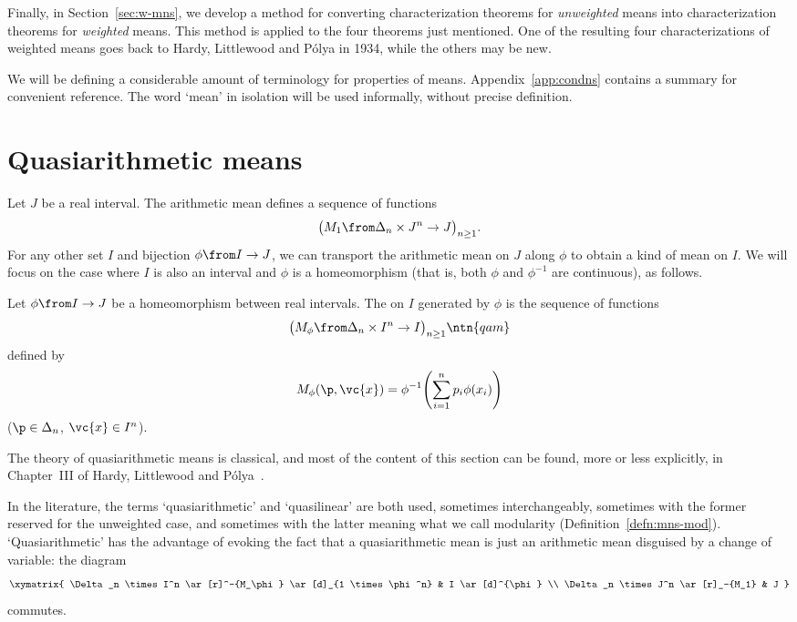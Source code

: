 Finally, in Section~\ref{sec:w-mns}, we develop a method for converting
characterization theorems for \emph{unweighted} means into characterization
theorems for \emph{weighted} means.  This method is applied to the four
theorems just mentioned.  One of the resulting four characterizations
of weighted means goes back to Hardy, Littlewood and P\'olya in
1934, while the others may be new.  

We will be defining a considerable amount of terminology for properties of
means.  Appendix~\ref{app:condns} contains a summary for convenient
reference.  The word `mean' in isolation will be used informally,
without precise definition.



\section{Quasiarithmetic means}


Let $J$ be a real interval.  The arithmetic mean defines a sequence of
functions
\[
\bigl( M_1 \from \Delta_n \times J^n \to J \bigr)_{n \geq 1}.
\]
For any other set $I$ and bijection $\phi \from I \to J$, we can transport
the arithmetic mean on $J$ along $\phi$ to obtain a kind of mean on $I$.
We will focus on the case where $I$ is also an interval and $\phi$ is a
homeomorphism (that is, both $\phi$ and $\phi^{-1}$
are continuous), as follows.

\begin{defn}
Let $\phi \from I \to J$ be a homeomorphism between real intervals.  The
 on $I$ generated by $\phi$ is the sequence of
functions 
\[
\bigl( M_\phi \from \Delta_n \times I^n \to I \bigr)_{n \geq 1}
\ntn{qam}
\]
defined by
\[
M_\phi(\p, \vc{x})  
=
\phi^{-1} \Biggl( \sum_{i = 1}^n p_i \phi(x_i) \Biggr)
\]
($\p \in \Delta_n$, $\vc{x} \in I^n$).
\end{defn}

The theory of quasiarithmetic means is classical, and most of the content
of this section can be found, more or less explicitly, in Chapter~III of
Hardy, Littlewood and P\'olya~\cite{HLP}.

\begin{remark}
In the literature, the terms `quasiarithmetic'%
% 
% 
and `quasilinear'%
% 
% 
are both
used, sometimes interchangeably, sometimes with the former reserved for the
unweighted case, and sometimes with the latter meaning what we call
modularity (Definition~\ref{defn:mns-mod}).  `Quasiarithmetic' has the
advantage of evoking the fact that a quasiarithmetic mean is just an
arithmetic mean disguised by a change of variable: 
the diagram
\[
\xymatrix{
\Delta_n \times I^n \ar[r]^-{M_\phi} \ar[d]_{1 \times \phi^n}    &
I \ar[d]^{\phi} \\
\Delta_n \times J^n \ar[r]_-{M_1}        &
J
}
\]
commutes. 
\end{remark}

